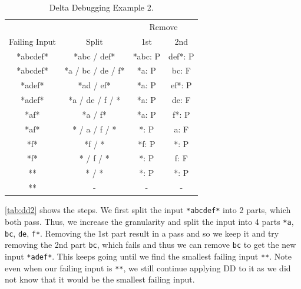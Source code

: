 \documentclass[oneside,11pt,dvipsnames]{book}
\newcommand{\code}[1]{\texttt{#1}}
\begin{document}
\begin{table}
    \caption{Delta Debugging Example 2.}\label{tab:dd2}
    \centering
    \small    
    \begin{tabular}{|c|c|c|c|}
        \toprule
        &&\multicolumn{2}{c|}{Remove} \\
        Failing Input & Split & 1st & 2nd\\
        \midrule
        *abcdef* & *abc / def* & *abc: P& def*: P\\
        *abcdef* & *a / bc / de / f* & *a: P& bc: F\\
        *adef* &  *ad / ef* & *a: P& ef*: P\\
        *adef* &  *a / de / f / * & *a: P& de: F\\
        *af* &  *a / f* & *a: P& f*: P\\
        *af* &  * / a / f / * & *: P& a: F\\
        *f* &  *f / * & *f: P& *: P\\
        *f* &  * / f / * & *: P& f: F\\
        ** &  * / * & *: P& *: P\\
        ** &  - &  - & - \\
        \bottomrule
    \end{tabular}
\end{table}

\autoref{tab:dd2} shows the steps. We first split the input \code{*abcdef*} into 2 parts, which both pass. Thus, we increase the granularity and split the input into 4 parts  \code{*a}, \code{bc}, \code{de}, \code{f*}.  Removing the 1st part result in a pass and so we keep it and try removing the 2nd part \code{bc}, which fails and thus we can remove \code{bc} to get the new input \code{*adef*}. This keeps going until we find the smallest failing input \code{**}. Note even when our failing input is \code{**}, we still continue applying DD to it as we did not know that it would be the smallest failing input.
\end{document}
